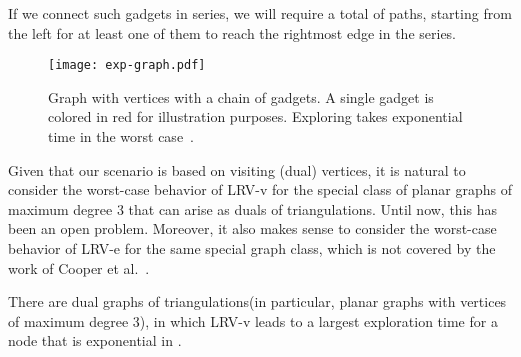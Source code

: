  If we connect
 such gadgets in series, we will require a total of
 paths,
starting from the left for at least one of them to reach the rightmost edge in the series.
\begin{figure}
\centering
\texttt{[image: exp-graph.pdf]}
\caption{Graph with  vertices with a chain of 
gadgets. A single gadget is colored in red for illustration purposes. Exploring takes exponential time in the worst case~\cite{cik+-drwug-11}.} \label{fig:reg_graph}
\vspace{-3mm}
\end{figure}
Given that our scenario is based on visiting (dual) vertices, it is natural
to consider the worst-case behavior of LRV-v for the special class
of planar graphs of maximum degree 3 that can arise as duals of triangulations.
Until now, this has been an open problem. Moreover, it also makes sense to
consider the worst-case behavior of LRV-e for the same special graph class,
which is not covered by the work of Cooper et al.~\cite{cik+-drwug-11}.

\begin{theorem}
\label{th:lb.LRV-v}
There are dual graphs of triangulations(in particular, planar graphs with  vertices of maximum degree 3), in which LRV-v
leads to a largest exploration time for a node that is exponential in .
\end{theorem}

